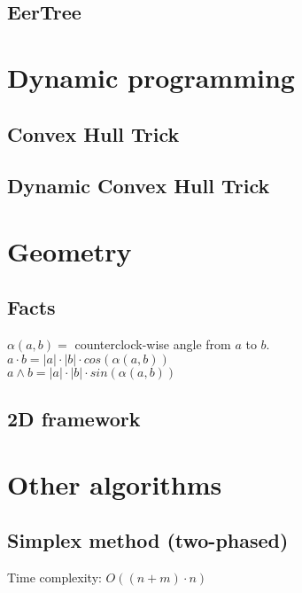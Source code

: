 \documentclass[11pt]{article}
\begin{document}
\subsection{EerTree}


\section{Dynamic programming}
\subsection{Convex Hull Trick}

\subsection{Dynamic Convex Hull Trick}


\section{Geometry}
\subsection{Facts}
$\alpha(a, b) =$ counterclock-wise angle from $a$ to $b$.\\
$a \cdot b = |a| \cdot |b| \cdot cos(\alpha(a, b))$\\
$a \wedge b = |a| \cdot |b| \cdot sin(\alpha(a, b))$\\
\subsection{2D framework}

\section{Other algorithms}
\subsection{Simplex method (two-phased)}
Time complexity: $O((n + m) \cdot n)$

\end{document}
